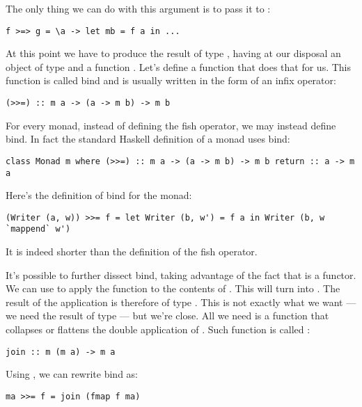 The only thing we can do with this argument is to pass it to :

\begin{verbatim}
f >=> g = \a -> let mb = f a in ...
\end{verbatim}

At this point we have to produce the result of type ,
having at our disposal an object of type  and a function
. Let's define a function that
does that for us. This function is called bind and is usually written in
the form of an infix operator:

\begin{verbatim}
(>>=) :: m a -> (a -> m b) -> m b
\end{verbatim}

For every monad, instead of defining the fish operator, we may instead
define bind. In fact the standard Haskell definition of a monad uses
bind:

\begin{verbatim}
class Monad m where (>>=) :: m a -> (a -> m b) -> m b return :: a -> m a
\end{verbatim}

Here's the definition of bind for the  monad:

\begin{verbatim}
(Writer (a, w)) >>= f = let Writer (b, w') = f a in Writer (b, w `mappend` w')
\end{verbatim}

It is indeed shorter than the definition of the fish operator.

It's possible to further dissect bind, taking advantage of the fact that
 is a functor. We can use  to apply the function
 to the contents of . This
will turn  into . The result of the application
is therefore of type . This is not exactly what we
want --- we need the result of type  --- but we're close.
All we need is a function that collapses or flattens the double
application of . Such function is called :

\begin{verbatim}
join :: m (m a) -> m a
\end{verbatim}

Using , we can rewrite bind as:

\begin{verbatim}
ma >>= f = join (fmap f ma)
\end{verbatim}

